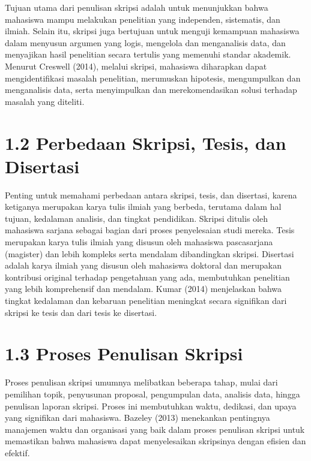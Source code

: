 \documentclass[
  indonesian,
  letterpaper,
  DIV=11,
  numbers=noendperiod]{scrreprt}
\begin{document}

Tujuan utama dari penulisan skripsi adalah untuk menunjukkan bahwa
mahasiswa mampu melakukan penelitian yang independen, sistematis, dan
ilmiah. Selain itu, skripsi juga bertujuan untuk menguji kemampuan
mahasiswa dalam menyusun argumen yang logis, mengelola dan menganalisis
data, dan menyajikan hasil penelitian secara tertulis yang memenuhi
standar akademik. Menurut Creswell (2014), melalui skripsi, mahasiswa
diharapkan dapat mengidentifikasi masalah penelitian, merumuskan
hipotesis, mengumpulkan dan menganalisis data, serta menyimpulkan dan
merekomendasikan solusi terhadap masalah yang diteliti.

\section*{1.2 Perbedaan Skripsi, Tesis, dan
Disertasi}\label{perbedaan-skripsi-tesis-dan-disertasi}


Penting untuk memahami perbedaan antara skripsi, tesis, dan disertasi,
karena ketiganya merupakan karya tulis ilmiah yang berbeda, terutama
dalam hal tujuan, kedalaman analisis, dan tingkat pendidikan. Skripsi
ditulis oleh mahasiswa sarjana sebagai bagian dari proses penyelesaian
studi mereka. Tesis merupakan karya tulis ilmiah yang disusun oleh
mahasiswa pascasarjana (magister) dan lebih kompleks serta mendalam
dibandingkan skripsi. Disertasi adalah karya ilmiah yang disusun oleh
mahasiswa doktoral dan merupakan kontribusi original terhadap
pengetahuan yang ada, membutuhkan penelitian yang lebih komprehensif dan
mendalam. Kumar (2014) menjelaskan bahwa tingkat kedalaman dan kebaruan
penelitian meningkat secara signifikan dari skripsi ke tesis dan dari
tesis ke disertasi.

\section*{1.3 Proses Penulisan Skripsi}\label{proses-penulisan-skripsi}


Proses penulisan skripsi umumnya melibatkan beberapa tahap, mulai dari
pemilihan topik, penyusunan proposal, pengumpulan data, analisis data,
hingga penulisan laporan skripsi. Proses ini membutuhkan waktu,
dedikasi, dan upaya yang signifikan dari mahasiswa. Bazeley (2013)
menekankan pentingnya manajemen waktu dan organisasi yang baik dalam
proses penulisan skripsi untuk memastikan bahwa mahasiswa dapat
menyelesaikan skripsinya dengan efisien dan efektif.
\end{document}
